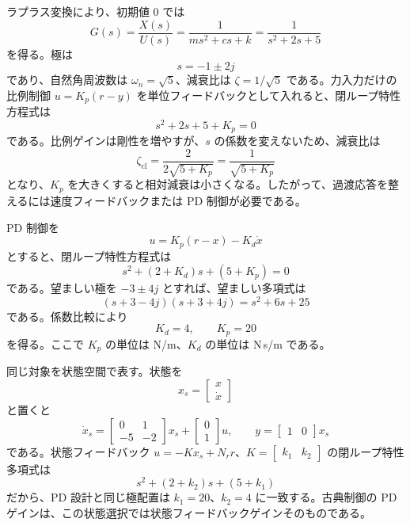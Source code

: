 ラプラス変換により、初期値 0 では
\begin{equation}
  G(s)=\frac{X(s)}{U(s)}
  =
  \frac{1}{ms^2+cs+k}
  =
  \frac{1}{s^2+2s+5}
\end{equation}
を得る。極は
\begin{equation}
  s=-1\pm2j
\end{equation}
であり、自然角周波数は $\omega_n=\sqrt{5}$、減衰比は $\zeta=1/\sqrt{5}$ である。力入力だけの比例制御 $u=K_p(r-y)$ を単位フィードバックとして入れると、閉ループ特性方程式は
\begin{equation}
  s^2+2s+5+K_p=0
\end{equation}
である。比例ゲインは剛性を増やすが、$s$ の係数を変えないため、減衰比は
\begin{equation}
  \zeta_{\mathrm{cl}}
  =
  \frac{2}{2\sqrt{5+K_p}}
  =
  \frac{1}{\sqrt{5+K_p}}
\end{equation}
となり、$K_p$ を大きくすると相対減衰は小さくなる。したがって、過渡応答を整えるには速度フィードバックまたは PD 制御が必要である。

PD 制御を
\begin{equation}
  u=K_p(r-x)-K_d\dot{x}
\end{equation}
とすると、閉ループ特性方程式は
\begin{equation}
  s^2+(2+K_d)s+(5+K_p)=0
\end{equation}
である。望ましい極を $-3\pm4j$ とすれば、望ましい多項式は
\begin{equation}
  (s+3-4j)(s+3+4j)=s^2+6s+25
\end{equation}
である。係数比較により
\begin{equation}
  K_d=4,\qquad K_p=20
\end{equation}
を得る。ここで $K_p$ の単位は N/m、$K_d$ の単位は N\,s/m である。

同じ対象を状態空間で表す。状態を
\begin{equation}
  x_s=
  \begin{bmatrix}
    x\\\dot{x}
  \end{bmatrix}
\end{equation}
と置くと
\begin{equation}
  \dot{x}_s=
  \begin{bmatrix}
    0&1\\
    -5&-2
  \end{bmatrix}x_s+
  \begin{bmatrix}
    0\\1
  \end{bmatrix}u,
  \qquad
  y=
  \begin{bmatrix}
    1&0
  \end{bmatrix}x_s
\end{equation}
である。状態フィードバック $u=-Kx_s+N_rr$、$K=\begin{bmatrix}k_1&k_2\end{bmatrix}$ の閉ループ特性多項式は
\begin{equation}
  s^2+(2+k_2)s+(5+k_1)
\end{equation}
だから、PD 設計と同じ極配置は $k_1=20$、$k_2=4$ に一致する。古典制御の PD ゲインは、この状態選択では状態フィードバックゲインそのものである。

